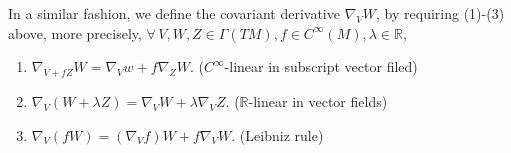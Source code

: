 In a similar fashion, we define the covariant derivative \(\nabla_V W\),
by requiring (1)-(3) above, more precisely, \(\forall\,V,W,Z\in \Gamma(TM),
f\in C^\infty(M),\lambda\in \mathbb{R}\),
\begin{enumerate}[(1)]
    \item \(\nabla_{V+fZ}W=\nabla_V w+f\nabla_Z W\). (\(C^\infty\)-linear
        in subscript vector filed)
    \item \(\nabla_V(W+\lambda Z)=\nabla_V W+\lambda\nabla_V Z\).
        (\(\mathbb{R}\)-linear in vector fields)
    \item \(\nabla_V(fW)=(\nabla_V f)W+f\nabla_V W\). (Leibniz rule)
\end{enumerate}
